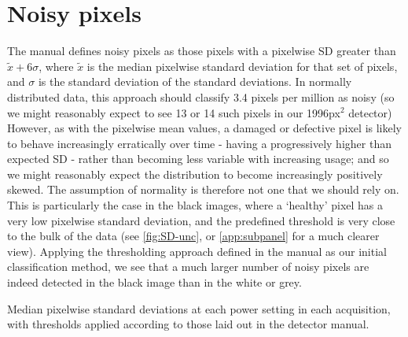 \documentclass[10pt,fleqn]{article}
\begin{document}



\section*{Noisy pixels}

The manual defines noisy pixels as those pixels with a pixelwise SD greater than $\tilde{x} + 6\sigma$, where $\tilde{x}$ is the median pixelwise standard deviation for that set of pixels, and $\sigma$ is the standard deviation of the standard deviations. In normally distributed data, this approach should classify 3.4 pixels per million as noisy (so we might reasonably expect to see 13 or 14 such pixels in our 1996px$^2$ detector) However, as with the pixelwise mean values, a damaged or defective pixel is likely to behave increasingly erratically over time - having a progressively higher than expected SD - rather than becoming less variable with increasing usage; and so we might reasonably expect the distribution to become increasingly positively skewed. The assumption of normality is therefore not one that we should rely on. This is particularly the case in the black images, where a `healthy' pixel has a very low pixelwise standard deviation, and the predefined threshold is very close to the bulk of the data (see \autoref{fig:SD-unc}, or \autoref{app:subpanel} for a much clearer view). Applying the thresholding approach defined in the manual as our initial classification method, we see that a much larger number of noisy pixels are indeed detected in the black image than in the white or grey.

\begin{table}[!ht] %
\begin{footnotesize}
\caption{Median pixelwise standard deviations at each power setting in each acquisition, with thresholds applied according to those laid out in the detector manual.}

\end{footnotesize}
\end{table}
\end{document}
